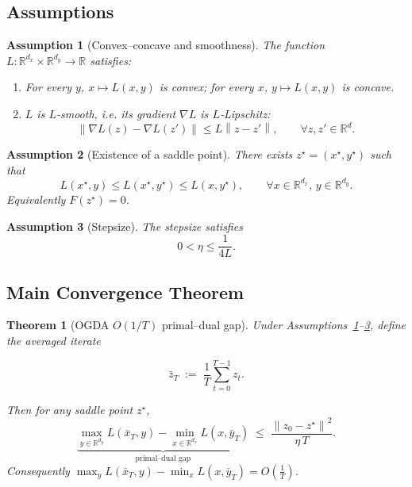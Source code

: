 \documentclass[11pt]{article}
\newtheorem{theorem}{Theorem}
\newtheorem{assumption}{Assumption}
\newcommand{\norm}[1]{\left\lVert #1\right\rVert}
\newcommand{\R}{\mathbb{R}}
\begin{document}
\subsection*{Assumptions}
\begin{assumption}[Convex–concave and smoothness]\label{ass:convexconcave}
The function $L:\R^{d_x}\times\R^{d_y}\to\R$ satisfies:
\begin{enumerate}[label=(\roman*)]
\item For every $y$, $x\mapsto L(x,y)$ is convex; for every $x$, $y\mapsto L(x,y)$ is concave.
\item $L$ is $L$‑smooth, i.e. its gradient $\nabla L$ is $L$‑Lipschitz:
\[
\norm{\nabla L(z)-\nabla L(z')}\le L\norm{z-z'},\qquad\forall z,z'\in\R^{d}.
\]
\end{enumerate}
\end{assumption}

\begin{assumption}[Existence of a saddle point]\label{ass:saddle}
There exists $z^\star=(x^\star,y^\star)$ such that
\[
L(x^\star,y)\le L(x^\star,y^\star)\le L(x,y^\star),\qquad\forall x\in\R^{d_x},\,y\in\R^{d_y}.
\]
Equivalently $F(z^\star)=0$.
\end{assumption}

\begin{assumption}[Stepsize]\label{ass:stepsize}
The stepsize satisfies
\[
0<\eta\le\frac{1}{4L}.
\]
\end{assumption}

\subsection*{Main Convergence Theorem}
\begin{theorem}[OGDA $O(1/T)$ primal–dual gap]\label{thm:ogda}
Under Assumptions~\ref{ass:convexconcave}–\ref{ass:stepsize}, define the averaged iterate  

\[
\bar z_T\;:=\;\frac{1}{T}\sum_{t=0}^{T-1}z_t.
\]

Then for any saddle point $z^\star$,
\[
\underbrace{\max_{y\in\R^{d_y}}L(\bar x_T,y)-\min_{x\in\R^{d_x}}L(x,\bar y_T)}_{\text{primal–dual gap}}
\;\le\;\frac{\norm{z_0-z^\star}^2}{\eta\,T}.
\tag{2}
\]
Consequently $\displaystyle \max_{y}L(\bar x_T,y)-\min_{x}L(x,\bar y_T)=O\!\left(\frac{1}{T}\right)$.
\end{theorem}
\end{document}
